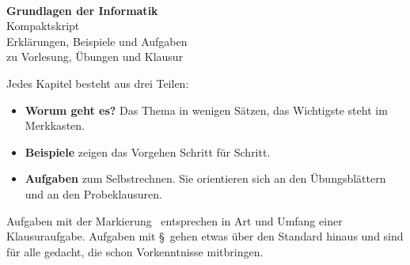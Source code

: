 \thispagestyle{empty}
\makeatletter
\begin{center}
{\@titlehead}\\[3.5cm]
{\Huge\bfseries Grundlagen der Informatik}\\[6mm]
{\LARGE Kompaktskript}\\[4mm]
{\large Erklärungen, Beispiele und Aufgaben\\zu Vorlesung, Übungen und Klausur}\\[2cm]
\end{center}
\makeatother
\vfill

\begin{merke}
Jedes Kapitel besteht aus drei Teilen:
\begin{itemize}[itemsep=0.1em]
\item \textbf{Worum geht es?} Das Thema in wenigen Sätzen, das Wichtigste steht im Merkkasten.
\item \textbf{Beispiele} zeigen das Vorgehen Schritt für Schritt.
\item \textbf{Aufgaben} zum Selbstrechnen. Sie orientieren sich an den Übungsblättern und an den Probeklausuren.
\end{itemize}
Aufgaben mit der Markierung \K\ entsprechen in Art und Umfang einer Klausuraufgabe. Aufgaben mit \S\ gehen etwas über den Standard hinaus und sind für alle gedacht, die schon Vorkenntnisse mitbringen.
\end{merke}
\newpage
\tableofcontents
\newpage
